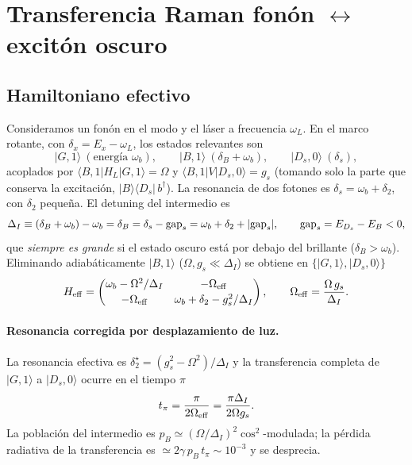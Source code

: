 \documentclass[11pt,a4paper]{article}
\newcommand{\ket}[1]{|#1\rangle}
\newcommand{\wb}{\omega_b}
\begin{document}
\section{Transferencia Raman fonón $\leftrightarrow$ excitón oscuro}\label{sec:raman}
\subsection{Hamiltoniano efectivo}
Consideramos un fonón en el modo y el láser a frecuencia $\omega_L$. En el marco rotante, con $\delta_x=E_x-\omega_L$,
los estados relevantes son
\begin{equation}
\ket{G,1}\ (\text{energía }\wb),\qquad \ket{B,1}\ (\delta_B+\wb),\qquad \ket{D_s,0}\ (\delta_s),
\end{equation}
acoplados por $\langle B,1|H_L|G,1\rangle=\Omega$ y $\langle B,1|V|D_s,0\rangle=g_s$ (tomando solo la parte que
conserva la excitación, $|B\rangle\langle D_s|\,b^\dagger$).
La resonancia de dos fotones es $\delta_s=\wb+\delta_2$, con $\delta_2$ pequeña. El detuning del intermedio es
\begin{equation}
\Delta_I\equiv(\delta_B+\wb)-\wb=\delta_B=\delta_s-\mathrm{gap}_s=\wb+\delta_2+|{\rm gap}_s| ,
\qquad \mathrm{gap}_s=E_{D_s}-E_B<0,
\end{equation}
que \emph{siempre es grande} si el estado oscuro está por debajo del brillante ($\delta_B>\wb$).
Eliminando adiabáticamente $\ket{B,1}$ ($\Omega,g_s\ll\Delta_I$) se obtiene en $\{\ket{G,1},\ket{D_s,0}\}$
\begin{equation}
H_{\rm eff}=\begin{pmatrix}\wb-\Omega^2/\Delta_I & -\Omega_{\rm eff}\\[2pt] -\Omega_{\rm eff} & \wb+\delta_2-g_s^2/\Delta_I\end{pmatrix},
\qquad \Omega_{\rm eff}=\frac{\Omega\,g_s}{\Delta_I}.
\label{eq:Heff}
\end{equation}
\paragraph{Resonancia corregida por desplazamiento de luz.}
La resonancia efectiva es $\delta_2^\star=(g_s^2-\Omega^2)/\Delta_I$ y la transferencia completa de $\ket{G,1}$ a $\ket{D_s,0}$
ocurre en el tiempo $\pi$
\begin{equation}
t_\pi=\frac{\pi}{2\Omega_{\rm eff}}=\frac{\pi\Delta_I}{2\Omega g_s}. \label{eq:tpi}
\end{equation}
La población del intermedio es $p_B\simeq(\Omega/\Delta_I)^2\cos^2$-modulada; la pérdida radiativa de la transferencia es
$\simeq 2\gamma\,p_B\,t_\pi\sim10^{-3}$ y se desprecia.
\end{document}
